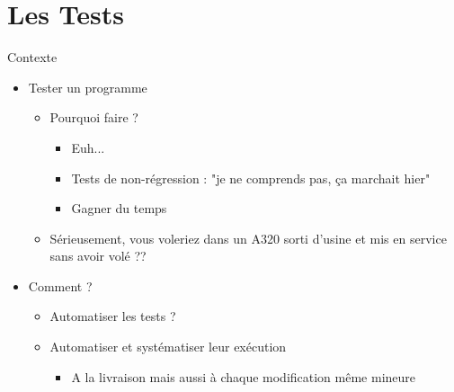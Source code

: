 \section{Les Tests}\label{les-tests}

\begin{frame}{Contexte}
\begin{itemize}

\item Tester un programme
\begin{itemize}
\item Pourquoi faire ?
\begin{itemize}
\item Euh...
\item Tests de non-régression : "je ne comprends pas, ça marchait hier"
\item Gagner du temps
\end{itemize}
\item Sérieusement, vous voleriez dans un A320 sorti d'usine et mis en service sans avoir volé ??
\end{itemize}
\item Comment ?
\begin{itemize}
\item Automatiser les tests ?
\item Automatiser et systématiser leur exécution
\begin{itemize}
\item A la livraison mais aussi à chaque modification même mineure
\end{itemize}
\end{itemize}
\end{itemize}

\end{frame}

